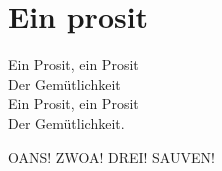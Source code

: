 \section{Ein prosit}
Ein Prosit, ein Prosit \\
Der Gemütlichkeit \\
Ein Prosit, ein Prosit\\ 
Der Gemütlichkeit.

OANS! ZWOA! DREI! SAUVEN!

